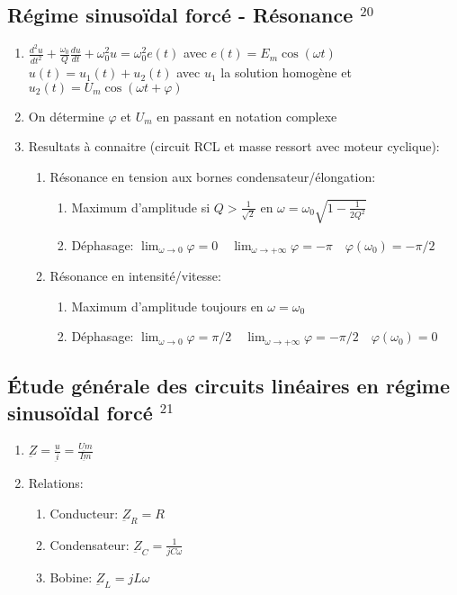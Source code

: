 \documentclass[fleqn]{article}
\theoremstyle{definition} \newtheorem*{defi}{D\'efinition}
\theoremstyle{definition} \newtheorem*{theo}{Th\'eor\`eme}
\theoremstyle{definition} \newtheorem*{coro}{Corollaire}
\theoremstyle{remark} \newtheorem*{rqs}{Remarques}
\theoremstyle{definition} \newtheorem*{prop}{Propri\'et\'e}
\begin{document}
\subsection{R\'egime sinuso\"idal forc\'e - R\'esonance $^{20}$}
\begin{enumerate}
	\item $\frac{d^2u}{dt^2} + \frac{\omega_0}{Q} \frac{du}{dt} + \omega_0^2 u = \omega_0^2 e(t)$ avec $e(t) = E_m \cos (\omega t)$\\
		$u(t) = u_1(t) + u_2(t)$ avec $u_1$ la solution homog\`ene et $u_2(t) = U_m \cos (\omega t + \varphi)$
	\item On d\'etermine $\varphi$ et $U_m$ en passant en notation complexe
	\item Resultats \`a connaitre (circuit RCL et masse ressort avec moteur cyclique):
		\begin{enumerate}
			\item R\'esonance en tension aux bornes condensateur/\'elongation:
				\begin{enumerate}
					\item Maximum d'amplitude si $Q > \frac{1}{\sqrt{2}}$ en $\omega = \omega_0 \sqrt{1 - \frac{1}{2Q^2}}$
					\item D\'ephasage: $\lim_{\omega \rightarrow 0} \varphi = 0 \quad \lim_{\omega \rightarrow +\infty} \varphi = -\pi
						\quad \varphi(\omega_0) = -\pi /2$
				\end{enumerate}
			\item R\'esonance en intensit\'e/vitesse:
				\begin{enumerate}
					\item Maximum d'amplitude toujours en $\omega = \omega_0$
					\item D\'ephasage: $\lim_{\omega \rightarrow 0} \varphi = \pi / 2 \quad \lim_{\omega \rightarrow +\infty} \varphi = -\pi /2
						\quad \varphi(\omega_0) = 0$
				\end{enumerate}
		\end{enumerate}
\end{enumerate}

\subsection{\'Etude g\'en\'erale des circuits lin\'eaires en r\'egime sinuso\"idal forc\'e $^{21}$}
\begin{enumerate}
	\item $\underbar{Z} = \frac{\underbar{u}}{\underbar{i}} = \frac{\underbar{Um}}{\underbar{Im}}$
	\item Relations:
		\begin{enumerate}
			\item Conducteur: $\underbar{Z}_R = R$
			\item Condensateur: $\underbar{Z}_C = \frac{1}{jC\omega}$
			\item Bobine: $\underbar{Z}_L = jL\omega$
		\end{enumerate}
\end{enumerate}
\end{document}
